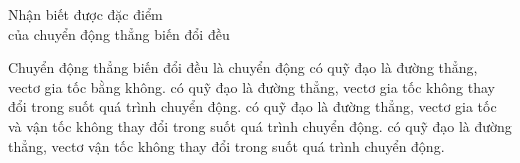 \begin{dang}{Nhận biết được đặc điểm \\của chuyển động thẳng biến đổi đều}
\end{dang}
\begin{vd}
	Chuyển động thẳng biến đổi đều là chuyển động
	\choice
	{có quỹ đạo là đường thẳng, vectơ gia tốc bằng không.}
	{\True có quỹ đạo là đường thẳng, vectơ gia tốc không thay đổi trong suốt quá trình chuyển động.}
	{có quỹ đạo là đường thẳng, vectơ gia tốc và vận tốc không thay đổi trong suốt quá trình chuyển động.}
	{có quỹ đạo là đường thẳng, vectơ vận tốc không thay đổi trong suốt quá trình chuyển động.}
\end{vd}

